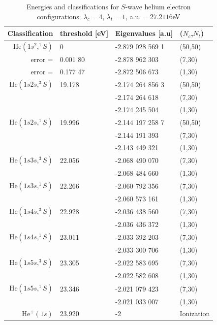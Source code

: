 \documentclass[aip
, pra
, showpacs
, aps
, twocolumn
, groupedaddress
, floatfix
]{revtex4}
\begin{document}
\begin{table}[htb]
\caption{\label{Tab_ENGS}
Energies and classifications for $S$-wave helium electron configurations.
$\lambda_c=4$, $\lambda_t=1$, a.u.$=27.2116$eV
}
\begin{ruledtabular}
\begin{tabular}{rlll}
Classification & threshold [eV] & Eigenvalues [a.u] & ($N_c$,$N_t$)   \\
\hline
$\mbox{He}(1s^2,^1S)$ & 0  & -2.879 028 569 1 &  (50,50)   \\ %
            error =          & 0.001 80 & -2.878 962 303   &  (7,30)    \\
            error =          & 0.177 47 & -2.872 506 673   &  (1,30)    \\
\hline
$\mbox{He}(1s2s,^3S)$      & 19.178 & -2.174 264 856 3 & (50,50) \\  %
                           &    & -2.174 264 618   &  (7,30)   \\
                           &    & -2.174 245 504   &  (1,30)    \\
\hline
$\mbox{He}(1s2s,^1S)$     &  19.996 & -2.144 197 258 7 &  (50,50) \\ %
                          &  & -2.144 191 393   &  (7,30)   \\
                          &   & -2.143 449 321   &  (1,30)    \\
\hline
$\mbox{He}(1s3s,^3S)$     & 22.056  & -2.068 490 070   &  (7,30)   \\
                          &        & -2.068 484 660   &  (1,30)    \\
\hline
$\mbox{He}(1s3s,^1S)$     & 22.266   & -2.060 792 356   & (7,30)    \\
                          &          & -2.060 573 161   &  (1,30)    \\
\hline
$\mbox{He}(1s4s,^3S)$    & 22.928  & -2.036 438 560   &  (7,30)    \\
                         &         & -2.036 436 372   &  (1,30)   \\
\hline
$\mbox{He}(1s4s,^1S)$   &  23.011 & -2.033 392 203 &  (7,30)   \\
                        &         & -2.033 300 706 &  (1,30)   \\
\hline
$\mbox{He}(1s5s,^3S)$   &   23.305  & -2.022 583 695   &  (7,30)    \\
                        &           & -2.022 582 608   &  (1,30)    \\
\hline
$\mbox{He}(1s5s,^1S)$   &  23.346   & -2.021 079 423   &  (7,30)    \\
                        &              & -2.021 033 007   &  (1,30)    \\
\hline
$\mbox{He}^+(1s)$       &  23.920 & -2 	 &    Ionization \\


\end{tabular}
\end{ruledtabular}
\end{table}
\end{document}
